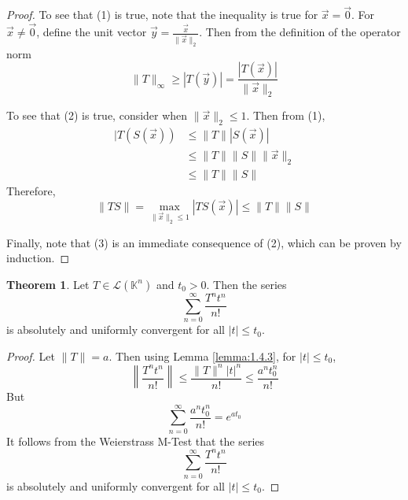\documentclass[11pt]{book}
\theoremstyle{definition}\newtheorem{definition}[subsection]{Definition}
\theoremstyle{definition}\newtheorem{example}[subsection]{Example}
\theoremstyle{definition}\newtheorem{notation}[subsection]{Notation}
\theoremstyle{definition}\newtheorem{remark}[subsection]{Remark}
\theoremstyle{theorem}\newtheorem{theorem}[subsection]{Theorem}
\theoremstyle{theorem}\newtheorem{lemma}[subsection]{Lemma}
\theoremstyle{theorem}\newtheorem{proposition}[subsection]{Proposition}
\theoremstyle{theorem}\newtheorem{corollary}[subsection]{Corollary}
\theoremstyle{theorem}\newtheorem{case}{Case}
\theoremstyle{remark}\newtheorem{subcase}{Subcase}[case]
\newcommand{\K}{\mathbb{K}}
\renewcommand{\L}{\mathscr{L}}
\begin{document}
\begin{proof}
    To see that (1) is true, note that the inequality is true for $\vec{x} = \vec{0}$. For $\vec{x} \neq \vec{0}$, define the unit vector $\vec{y} = \frac{\vec{x}}{\|\vec{x}\|_2}$. Then from the definition of the operator norm
    \begin{equation*}
        \|T\|_{\infty} \geq |T(\vec{y})| = \frac{|T(\vec{x})|}{\|\vec{x}\|_2}
    \end{equation*}

    To see that (2) is true, consider when $\|\vec{x}\|_2 \leq 1$. Then from (1),
    \begin{align*}
        |T(S(\vec{x})) &\leq \|T\||S(\vec{x})| \\
        &\leq \|T\|\|S\| \|\vec{x}\|_2 \\
        &\leq \|T\| \|S\|
    \end{align*}
    Therefore,
    \begin{equation*}
        \|TS\| = \max_{\|\vec{x}\|_2 \leq 1} |TS(\vec{x})| \leq \|T\| \|S\|
    \end{equation*}

    Finally, note that (3) is an immediate consequence of (2), which can be proven by induction.
\end{proof}

\begin{theorem}\label{theorem:1.4.4}
    Let $T \in \L(\K^n)$ and $t_0 > 0$. Then the series
    \begin{equation*}
        \sum_{n = 0}^{\infty} \frac{T^n t^n}{n!}
    \end{equation*}
    is absolutely and uniformly convergent for all $|t| \leq t_0$.
\end{theorem}

\begin{proof}
    Let $\|T\| = a$. Then using Lemma \ref{lemma:1.4.3}, for $|t| \leq t_0$,
    \begin{equation*}
        \left\|\frac{T^n t^n}{n!}\right\| \leq \frac{\|T\|^n |t|^n}{n!} \leq \frac{a^n t_0^n}{n!}
    \end{equation*}
    But
    \begin{equation*}
        \sum_{n = 0}^{\infty} \frac{a^nt_0^n}{n!} = e^{at_0}
    \end{equation*}
    It follows from the Weierstrass M-Test that the series 
    \begin{equation*}
        \sum_{n = 0}^{\infty} \frac{T^n t^n}{n!}
    \end{equation*}
    is absolutely and uniformly convergent for all $|t| \leq t_0$.
\end{proof}
\end{document}
